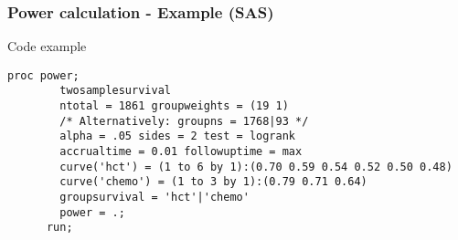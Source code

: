 \documentclass[11pt, aspectratio = 169]{beamer}
\begin{document}
\begin{frame}[fragile]
  \frametitle{Power calculation - Example (SAS)}
  \begin{block}{Code example}
    \begin{lstlisting}[gobble = 6]
      proc power;
        twosamplesurvival
        ntotal = 1861 groupweights = (19 1)
        /* Alternatively: groupns = 1768|93 */
        alpha = .05 sides = 2 test = logrank
        accrualtime = 0.01 followuptime = max
        curve('hct') = (1 to 6 by 1):(0.70 0.59 0.54 0.52 0.50 0.48)
        curve('chemo') = (1 to 3 by 1):(0.79 0.71 0.64)
        groupsurvival = 'hct'|'chemo'
        power = .;
      run;
    \end{lstlisting}
  \end{block}
\end{frame}
\end{document}
